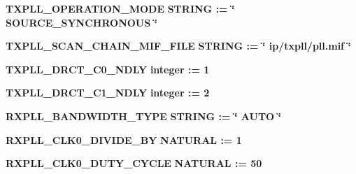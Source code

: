 \begin{DoxyCompactItemize}
\item 
{\bf T\+X\+P\+L\+L\+\_\+\+O\+P\+E\+R\+A\+T\+I\+O\+N\+\_\+\+M\+O\+DE} {\bfseries {\bfseries \textcolor{comment}{S\+T\+R\+I\+NG}\textcolor{vhdlchar}{ }\textcolor{vhdlchar}{ }\textcolor{vhdlchar}{\+:}\textcolor{vhdlchar}{=}\textcolor{vhdlchar}{ }\textcolor{vhdlchar}{ }\textcolor{vhdlchar}{ }\textcolor{vhdlchar}{ }\textcolor{keyword}{\char`\"{} S\+O\+U\+R\+C\+E\+\_\+\+S\+Y\+N\+C\+H\+R\+O\+N\+O\+U\+S \char`\"{}}\textcolor{vhdlchar}{ }}}
\item 
{\bf T\+X\+P\+L\+L\+\_\+\+S\+C\+A\+N\+\_\+\+C\+H\+A\+I\+N\+\_\+\+M\+I\+F\+\_\+\+F\+I\+LE} {\bfseries {\bfseries \textcolor{comment}{S\+T\+R\+I\+NG}\textcolor{vhdlchar}{ }\textcolor{vhdlchar}{ }\textcolor{vhdlchar}{\+:}\textcolor{vhdlchar}{=}\textcolor{vhdlchar}{ }\textcolor{vhdlchar}{ }\textcolor{vhdlchar}{ }\textcolor{vhdlchar}{ }\textcolor{keyword}{\char`\"{} ip/txpll/pll.\+mif \char`\"{}}\textcolor{vhdlchar}{ }}}
\item 
{\bf T\+X\+P\+L\+L\+\_\+\+D\+R\+C\+T\+\_\+\+C0\+\_\+\+N\+D\+LY} {\bfseries {\bfseries \textcolor{comment}{integer}\textcolor{vhdlchar}{ }\textcolor{vhdlchar}{ }\textcolor{vhdlchar}{\+:}\textcolor{vhdlchar}{=}\textcolor{vhdlchar}{ }\textcolor{vhdlchar}{ } \textcolor{vhdldigit}{1} \textcolor{vhdlchar}{ }}}
\item 
{\bf T\+X\+P\+L\+L\+\_\+\+D\+R\+C\+T\+\_\+\+C1\+\_\+\+N\+D\+LY} {\bfseries {\bfseries \textcolor{comment}{integer}\textcolor{vhdlchar}{ }\textcolor{vhdlchar}{ }\textcolor{vhdlchar}{\+:}\textcolor{vhdlchar}{=}\textcolor{vhdlchar}{ }\textcolor{vhdlchar}{ } \textcolor{vhdldigit}{2} \textcolor{vhdlchar}{ }}}
\item 
{\bf R\+X\+P\+L\+L\+\_\+\+B\+A\+N\+D\+W\+I\+D\+T\+H\+\_\+\+T\+Y\+PE} {\bfseries {\bfseries \textcolor{comment}{S\+T\+R\+I\+NG}\textcolor{vhdlchar}{ }\textcolor{vhdlchar}{ }\textcolor{vhdlchar}{\+:}\textcolor{vhdlchar}{=}\textcolor{vhdlchar}{ }\textcolor{vhdlchar}{ }\textcolor{vhdlchar}{ }\textcolor{vhdlchar}{ }\textcolor{keyword}{\char`\"{} A\+U\+T\+O \char`\"{}}\textcolor{vhdlchar}{ }}}
\item 
{\bf R\+X\+P\+L\+L\+\_\+\+C\+L\+K0\+\_\+\+D\+I\+V\+I\+D\+E\+\_\+\+BY} {\bfseries {\bfseries \textcolor{comment}{N\+A\+T\+U\+R\+AL}\textcolor{vhdlchar}{ }\textcolor{vhdlchar}{ }\textcolor{vhdlchar}{\+:}\textcolor{vhdlchar}{=}\textcolor{vhdlchar}{ }\textcolor{vhdlchar}{ } \textcolor{vhdldigit}{1} \textcolor{vhdlchar}{ }}}
\item 
{\bf R\+X\+P\+L\+L\+\_\+\+C\+L\+K0\+\_\+\+D\+U\+T\+Y\+\_\+\+C\+Y\+C\+LE} {\bfseries {\bfseries \textcolor{comment}{N\+A\+T\+U\+R\+AL}\textcolor{vhdlchar}{ }\textcolor{vhdlchar}{ }\textcolor{vhdlchar}{\+:}\textcolor{vhdlchar}{=}\textcolor{vhdlchar}{ }\textcolor{vhdlchar}{ } \textcolor{vhdldigit}{50} \textcolor{vhdlchar}{ }}}

\end{DoxyCompactItemize}
